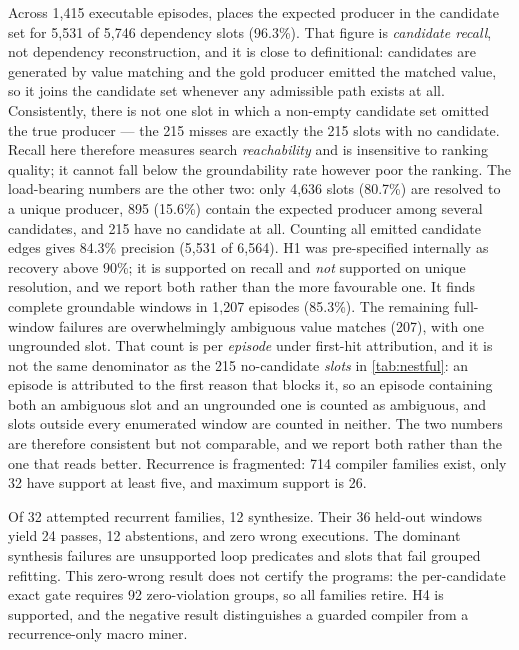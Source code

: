 \begin{table}[t]
  \centering
  \caption{External NESTFUL compiler results.  ``Wrong'' means a synthesized program
  executed but disagreed with the recorded held-out outputs; abstentions are explicit.}
  \label{tab:nestful}
  \resizebox{\columnwidth}{!}{}
\end{table}

Across 1,415 executable episodes, \method places the expected producer in the candidate
set for 5,531 of 5,746 dependency slots (96.3\%).  That figure is \emph{candidate recall},
not dependency reconstruction, and it is close to definitional: candidates are generated by
value matching and the gold producer emitted the matched value, so it joins the candidate set
whenever any admissible path exists at all.  Consistently, there is not one slot in which a
non-empty candidate set omitted the true producer --- the 215 misses are exactly the 215 slots
with no candidate.  Recall here therefore measures search \emph{reachability} and is
insensitive to ranking quality; it cannot fall below the groundability rate however poor the
ranking.  The load-bearing numbers are the other two: only 4,636 slots (80.7\%) are
resolved to a unique producer, 895 (15.6\%) contain the expected producer among several
candidates, and 215 have no candidate at all.  Counting all emitted candidate edges gives
84.3\% precision (5,531 of 6,564).  H1 was pre-specified internally as recovery above 90\%; it is
supported on recall and \emph{not} supported on unique resolution, and we report both
rather than the more favourable one.  It finds complete groundable windows in
1,207 episodes (85.3\%).  The remaining full-window failures are overwhelmingly
ambiguous value matches (207), with one ungrounded slot.  That count is per \emph{episode}
under first-hit attribution, and it is not the same denominator as the 215 no-candidate
\emph{slots} in \cref{tab:nestful}: an episode is attributed to the first reason that blocks
it, so an episode containing both an ambiguous slot and an ungrounded one is counted as
ambiguous, and slots outside every enumerated window are counted in neither.  The two numbers
are therefore consistent but not comparable, and we report both rather than the one that
reads better.  Recurrence is fragmented:
714 compiler families exist, only 32 have support at least five, and maximum support is
26.

Of 32 attempted recurrent families, 12 synthesize.  Their 36 held-out windows yield 24
passes, 12 abstentions, and zero wrong executions.  The dominant synthesis failures are
unsupported loop predicates and slots that fail grouped refitting.  This zero-wrong result
does not certify the programs: the per-candidate exact gate requires 92 zero-violation groups, so all
families retire.  H4 is supported, and the negative result distinguishes a guarded
compiler from a recurrence-only macro miner.

